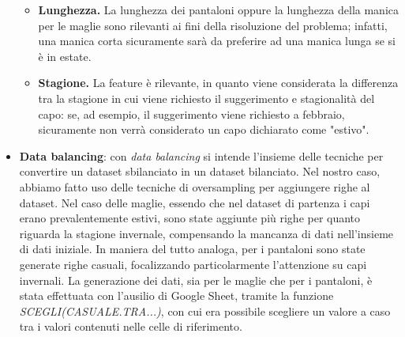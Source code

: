\documentclass[a4paper, 11pt, oneside]{report}
\begin{document}
\begin{itemize}
\begin{itemize}
                        \item \textbf{Lunghezza.} La lunghezza dei pantaloni oppure la lunghezza della manica per le maglie sono rilevanti ai fini della
                        risoluzione del problema; infatti, una manica corta sicuramente sarà da preferire ad una manica lunga se si è in estate.
                        \item \textbf{Stagione.} La feature è rilevante, in quanto viene considerata la differenza tra la stagione in cui viene richiesto il
                        suggerimento e stagionalità del capo: se, ad esempio, il suggerimento viene richiesto a febbraio, sicuramente non verrà considerato
                        un capo dichiarato come "estivo".
                    \end{itemize}
                    \item \textbf{Data balancing}: con \textit{data balancing} si intende l'insieme delle tecniche per convertire un dataset sbilanciato in un
                    dataset bilanciato. Nel nostro caso, abbiamo fatto uso delle tecniche di oversampling per aggiungere righe al dataset.
                    Nel caso delle maglie, essendo che nel dataset di partenza i capi erano prevalentemente estivi, sono state aggiunte più righe per quanto riguarda
                    la stagione invernale, compensando la mancanza di dati nell'insieme di dati iniziale. In maniera del tutto analoga, per i pantaloni sono state
                    generate righe casuali, focalizzando particolarmente l'attenzione su capi invernali. La generazione dei dati, sia per le maglie che per i pantaloni,
                    è stata effettuata con l'ausilio di Google Sheet, tramite la funzione \textit{SCEGLI(CASUALE.TRA...)}, con cui era possibile scegliere un valore a caso
                    tra i valori contenuti nelle celle di riferimento.
                \end{itemize}
\end{document}
